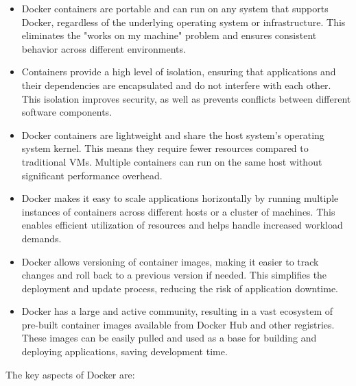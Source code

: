 \begin{itemize}
  \item Docker containers are portable and can run on any system that supports Docker, regardless of the underlying operating system or infrastructure. This eliminates the "works on my machine" problem and ensures consistent behavior across different environments.
  \item Containers provide a high level of isolation, ensuring that applications and their dependencies are encapsulated and do not interfere with each other. This isolation improves security, as well as prevents conflicts between different software components.
  \item Docker containers are lightweight and share the host system's operating system kernel. This means they require fewer resources compared to traditional \acp{VM}. Multiple containers can run on the same host without significant performance overhead.
  \item Docker makes it easy to scale applications horizontally by running multiple instances of containers across different hosts or a cluster of machines. This enables efficient utilization of resources and helps handle increased workload demands.
  \item Docker allows versioning of container images, making it easier to track changes and roll back to a previous version if needed. This simplifies the deployment and update process, reducing the risk of application downtime.
  \item Docker has a large and active community, resulting in a vast ecosystem of pre-built container images available from Docker Hub and other registries. These images can be easily pulled and used as a base for building and deploying applications, saving development time.
\end{itemize}
The key aspects of Docker are:
